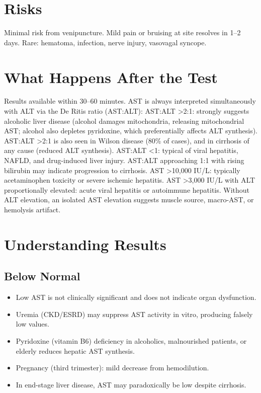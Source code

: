\section*{Risks}
Minimal risk from venipuncture. Mild pain or bruising at site resolves in 1--2 days. Rare: hematoma, infection, nerve injury, vasovagal syncope.

\section*{What Happens After the Test}
Results available within 30--60 minutes. AST is always interpreted simultaneously with ALT via the De Ritis ratio (AST:ALT): AST:ALT >2:1: strongly suggests alcoholic liver disease (alcohol damages mitochondria, releasing mitochondrial AST; alcohol also depletes pyridoxine, which preferentially affects ALT synthesis). AST:ALT >2:1 is also seen in Wilson disease (80\% of cases), and in cirrhosis of any cause (reduced ALT synthesis). AST:ALT <1: typical of viral hepatitis, NAFLD, and drug-induced liver injury. AST:ALT approaching 1:1 with rising bilirubin may indicate progression to cirrhosis. AST >10,000 IU/L: typically acetaminophen toxicity or severe ischemic hepatitis. AST >3,000 IU/L with ALT proportionally elevated: acute viral hepatitis or autoimmune hepatitis. Without ALT elevation, an isolated AST elevation suggests muscle source, macro-AST, or hemolysis artifact.

\section*{Understanding Results}

\subsection*{Below Normal}
\begin{itemize}
  \item Low AST is not clinically significant and does not indicate organ dysfunction.
  \item Uremia (CKD/ESRD) may suppress AST activity in vitro, producing falsely low values.
  \item Pyridoxine (vitamin B6) deficiency in alcoholics, malnourished patients, or elderly reduces hepatic AST synthesis.
  \item Pregnancy (third trimester): mild decrease from hemodilution.
  \item In end-stage liver disease, AST may paradoxically be low despite cirrhosis.
\end{itemize}

